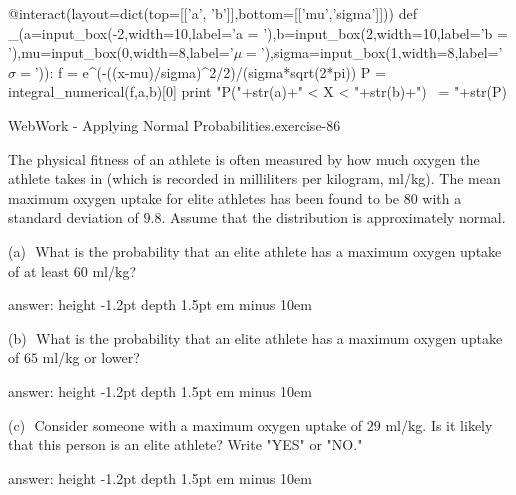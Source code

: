 \documentclass[10pt,]{book}
\newcommand{\fillin}[1]{\leavevmode\leaders\vrule height -1.2pt depth 1.5pt \hskip #1em minus #1em \null}
\numberwithin{equation}{section}
\begin{document}
\par
\hypertarget{p-1237}{}%
\leavevmode%
\begin{sageinput}
@interact(layout=dict(top=[['a', 'b']],bottom=[['mu','sigma']]))
def _(a=input_box(-2,width=10,label='a = '),b=input_box(2,width=10,label='b = '),mu=input_box(0,width=8,label='$\mu = $'),sigma=input_box(1,width=8,label='$\sigma = $')):
    f = e^(-((x-mu)/sigma)^2/2)/(sigma*sqrt(2*pi))
    P = integral_numerical(f,a,b)[0]
    print "P("+str(a)+" < X < "+str(b)+") ~= "+str(P)
\end{sageinput}
%
\par
\hypertarget{p-1238}{}%
\begin{inlineexercise}{WebWork - Applying Normal Probabilities.}{exercise-86}%
\hypertarget{p-1239}{}%
%
\par\medskip
\hypertarget{p-1240}{}%
The physical fitness of an athlete is often measured by how much oxygen the athlete takes in (which is recorded in milliliters per kilogram, ml/kg).  The mean maximum oxygen uptake for elite athletes has been found to be \(80\) with a standard deviation of \(9.8\).  Assume that the distribution is approximately normal.%
\par
\hypertarget{p-1241}{}%
(a) \(\) What is the probability that an elite athlete has a maximum oxygen uptake of at least \(60\) ml/kg?%
\par
\hypertarget{p-1242}{}%
answer:  \fillin{10}%
\par
\hypertarget{p-1243}{}%
(b) \(\) What is the probability that an elite athlete has a maximum oxygen uptake of \(65\) ml/kg or lower?%
\par
\hypertarget{p-1244}{}%
answer:  \fillin{10}%
\par
\hypertarget{p-1245}{}%
(c) \(\) Consider someone with a maximum oxygen uptake of \(29\) ml/kg.  Is it likely that this person is an elite athlete? Write "YES" or "NO."%
\par
\hypertarget{p-1246}{}%
answer:  \fillin{10}%
\end{inlineexercise}
%
%
%
\typeout{************************************************}
\typeout{************************************************}
%
\end{document}
